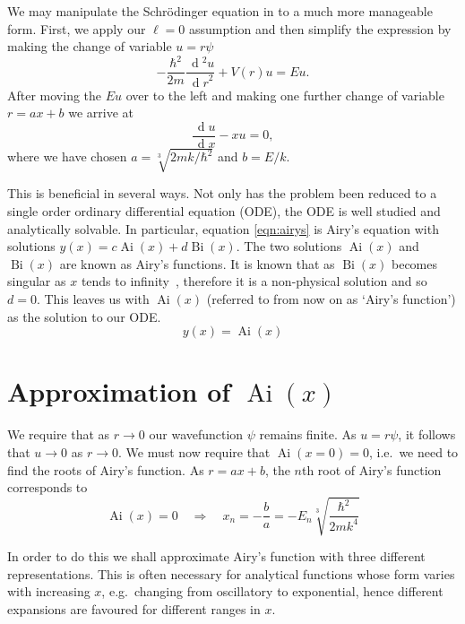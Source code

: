 \documentclass[]{article}
\renewcommand{\d}[1]{\ensuremath{\,\operatorname{d}\!{#1}}}
\newcommand{\Ai}[1]{\ensuremath{\operatorname{Ai}({#1})}}
\newcommand{\Bi}[1]{\ensuremath{\operatorname{Bi}({#1})}}
\begin{document}
We may manipulate the Schr\"{o}dinger equation in to a much more manageable form. First, we apply our $\ell = 0$ assumption and then simplify the expression by making the change of variable $u = r\psi$
\[
-\frac{\hbar^{2}}{2m}
 \frac{\d{^{2}u}}{\d{r}^{2}}
+ V(r)u = Eu.
\]
After moving the $Eu$ over to the left and making one further change of variable $r = ax + b$ we  arrive at
\begin{equation}\label{eqn:airys}
\frac{\d{u}}{\d{x}} - xu = 0,
\end{equation}
where we have chosen $a = \sqrt[3]{2mk/\hbar^{2}}$ and $b = E/k$.

This is beneficial in several ways. Not only has the problem been reduced to a single order ordinary differential equation (ODE), the ODE is well studied and analytically solvable. In particular, equation \ref{eqn:airys} is Airy's equation with solutions $y(x) = c\Ai{x} + d\Bi{x}$. The two solutions $\Ai{x}$ and $\Bi{x}$ are known as Airy's functions. It is known that as $\Bi{x}$ becomes singular as $x$ tends to infinity~\cite{ref:abramowitz}, therefore it is a non-physical solution and so $d = 0$. This leaves us with $\Ai{x}$ (referred to from now on as `Airy's function') as the solution to our ODE.\footnotemark
\[
y(x) = \Ai{x}
\]

\footnotetext{$\Ai{x} \to 0$ as $x \to \pm\infty$.}



\section{Approximation of \Ai{x}}\label{sec:approximation}

We require that as $r \to 0$ our wavefunction $\psi$ remains finite. As $u = r\psi$, it follows that $u \to 0$ as $r \to 0$. We must now require that $\Ai{x = 0} = 0$, i.e.\ we need to find the roots of Airy's function. As $r = ax + b$, the $n$th root of Airy's function corresponds to
\begin{equation}\label{eqn:rootexpression}
\Ai{x} = 0 \quad\Rightarrow\quad x_{n} = -\frac{b}{a} = -E_{n}\sqrt[3]{\frac{\hbar^{2}}{2mk^{4}}}
\end{equation}

In order to do this we shall approximate Airy's function with three different representations. This is often necessary for analytical functions whose form varies with increasing $x$, e.g.\ changing from oscillatory to exponential, hence different expansions are favoured for different ranges in $x$.
\end{document}

